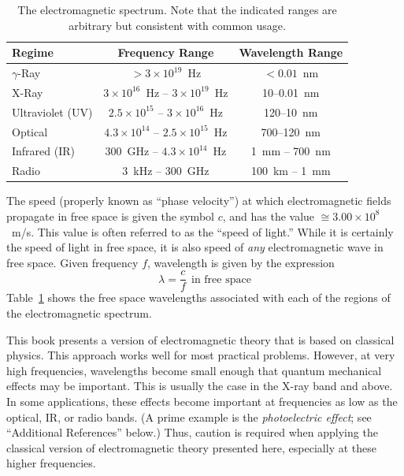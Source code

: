 \begin{table}[t]
\begin{center}
\begin{tabular}{lcc}
Regime & Frequency Range & Wavelength Range \\
\hline
$\gamma$-Ray & $>3\times 10^{19}$~Hz & $<0.01$~nm   \\
X-Ray & $3\times 10^{16}$~Hz -- $3\times 10^{19}$~Hz & 10--0.01~nm  \\
Ultraviolet (UV) & $2.5\times 10^{15}$ -- $3\times 10^{16}$~Hz & 120--10~nm  \\
Optical & $4.3\times 10^{14}$ -- $2.5\times 10^{15}$~Hz & 700--120~nm  \\
Infrared (IR) & 300~GHz -- $4.3\times 10^{14}$~Hz & 1~mm -- 700~nm  \\
Radio & 3~kHz -- 300~GHz & 100~km -- 1~mm  \\
\end{tabular}
\end{center}
\caption{The electromagnetic spectrum.  Note that the indicated ranges are arbitrary but consistent with common usage.}
\label{m0075_tEMS}
\end{table}

The speed (properly known as ``phase velocity'') 
at which electromagnetic fields propagate in free space is given the symbol $c$, and has the value $\cong 3.00 \times 10^8$~m/s. 
This value is often referred to as the ``speed of light.''
While it is certainly the speed of light in free space, it is also speed of \emph{any} electromagnetic wave in free space.
Given frequency $f$, wavelength 
is given by the expression
$$
\lambda=\frac{c}{f}~~\mbox{in free space}
$$
Table~\ref{m0075_tEMS} shows the free space wavelengths associated with each of the regions of the electromagnetic spectrum.

This book presents a version of electromagnetic theory that is based on classical physics.
This approach works well for most practical problems. 
However, at very high frequencies, wavelengths become small enough that quantum mechanical effects may be important.
This is usually the case in the X-ray band and above.
In some applications, these effects become important at frequencies as low as the optical, IR, or radio bands. (A prime example is the \emph{photoelectric effect}; 
see ``Additional References'' below.)
Thus, caution is required when applying the classical version of electromagnetic theory presented here, especially at these higher frequencies.

